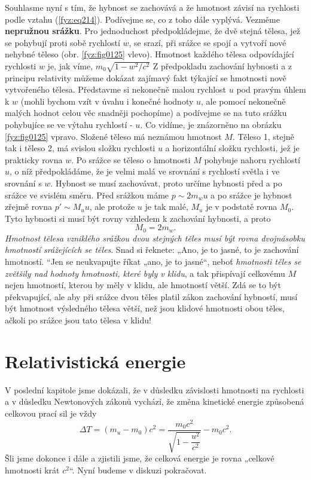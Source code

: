     Souhlasme nyní s tím, že hybnost se zachovává a že hmotnost závisí na rychlosti podle vztahu 
    (\ref{fyz:eq214}). Podívejme se, co z toho dále vyplývá. Vezměme \textbf{nepružnou srážku}. Pro 
    jednoduchost předpokládejme, že dvě stejná tělesa, jež se pohybují proti sobě rychlostí \(w\), 
    se srazí, při srážce se spojí a vytvoří nové nehybné těleso (obr. \ref{fyz:fig0125} vlevo). 
    Hmotnost každého tělesa odpovídající rychlosti \(w\) je, jak víme, \(m_0\sqrt{1 - w^2/c^2}\) Z 
    předpokladu zachování hybnosti a z principu relativity můžeme dokázat zajímavý fakt týkající se 
    hmotnosti nově vytvořeného tělesa. Představme si nekonečně malou rychlost \(u\) pod pravým 
    úhlem k \(w\) (mohli bychom vzít v úvahu i konečné hodnoty \(u\), ale pomocí nekonečně malých 
    hodnot celou věc snadněji pochopíme) a podívejme se na tuto srážku pohybujíce se ve výtahu 
    rychlostí - \(u\). Co vidíme, je znázorněno na obrázku \ref{fyz:fig0125} vpravo. Složené těleso 
    má neznámou hmotnost \(M\). Těleso 1, stejně tak i těleso 2, má svislou složku rychlosti \(u\) 
    a horizontální složku rychlosti, jež je prakticky rovna \(w\). Po srážce se těleso o 
    hmotnosti \(M\) pohybuje nahoru rychlostí \(u\), o níž předpokládáme, že je velmi malá ve 
    srovnání s rychlostí světla i ve srovnání s \(w\). Hybnost se musí zachovávat, proto určíme 
    hybnosti před a po srážce ve svislém směru. Před srážkou máme \(p \sim 2m_wu\) a po srážce je 
    hybnost zřejmě rovna \(p' \sim M_uu\), ale protože \(u\) je tak malé, \(M_u\) je v podstatě 
    rovna \(M_0\). Tyto hybnosti si musí být rovny vzhledem k zachování hybnosti, a proto
    \begin{equation}\label{fyz:eq216}
      M_0 = 2m_w.
    \end{equation}
    \emph{Hmotnost tělesa vzniklého srážkou dvou stejných těles musí být rovna dvojnásobku 
    hmotností srážejících se těles}. Snad si řeknete: „Ano, je to jasné, to je zachování hmotností. 
    “Jen se neukvapujte říkat „ano, je to jasné“, neboť \emph{hmotnosti těles se zvětšily nad 
    hodnoty hmotnosti, které byly v klidu}, a tak přispívají celkovému \(M\) nejen hmotností, 
    kterou by měly v klidu, ale hmotností větší. Zdá se to být překvapující, ale aby při srážce 
    dvou těles platil zákon zachování hybností, musí být hmotnost výsledného tělesa větší, než jsou 
    klidové hmotnosti obou těles, ačkoli po srážce jsou tato tělesa v klidu!
    
  \section{Relativistická energie}\label{fyz:IchapXVIsecV}
    V poslední kapitole jsme dokázali, že v důsledku závislosti hmotnosti na rychlosti a v důsledku 
    Newtonových zákonů vychází, že změna kinetické energie způsobená celkovou prací sil je vždy
    \begin{equation}\label{fyz:eq217}
      \Delta T = (m_u - m_0)c^2 = \frac{m_0c^2}{\sqrt{1 - \dfrac{u^2}{c^2}}} - m_0c^2.
    \end{equation}
    Šli jsme dokonce i dále a zjistili jsme, že celková energie je rovna „celkové hmotnosti krát 
    \(c^2\)“. Nyní budeme v diskuzi pokračovat.
    
